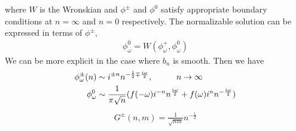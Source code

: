 \documentclass[JHEP,12pt]{article}
\begin{document}
where $W$ is the Wronskian and $\phi^{\pm}$ and $\phi^0$ satisfy appropriate boundary conditions at $n=\infty$ and $n=0$ respectively. The normalizable solution can be expressed in terms of $\phi^{\pm}$, 
\begin{align}
\phi^0_\omega=W(\phi^{+}_\omega,\phi^0_\omega)
\end{align}
\indent We can be more explicit in the case where $b_n$ is smooth. Then we have 
\begin{align}
\phi^{\pm}_\omega(n)&\sim i^{\pm  n }n^{-\frac{1}{2}\mp \frac{i\omega}{2}},\hspace{10 mm}n\to \infty\\
\phi^0_\omega&\sim\frac{1}{\pi\sqrt{n}}(f(-\omega)i^{-n}n^{\frac{i\omega}{2}}+f(\omega)i^{n}n^{-\frac{i\omega}{2}})
\end{align}
\begin{align}
G^{\pm}(n,m)=\frac{1}{\sqrt{nm}}n^{-\frac{1}{2}}
\end{align}
\end{document}
